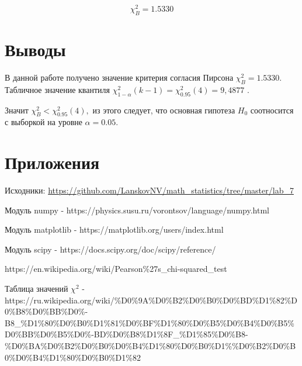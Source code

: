 \documentclass[12pt]{article}
\begin{document}
$$\chi_B^2= 1.5330$$

\section{Выводы}

В данной работе получено значение критерия согласия Пирсона $\chi_B^2 = 1.5330.$ Табличное значение квантиля  $\chi^2_{1-\alpha}(k-1)=\chi^2_{0.95}(4) = 9,4877$ \cite{chi_quant}.

Значит $\chi_B^2 < \chi^2_{0.95}(4),$ из этого следует, что основная гипотеза $H_0$ соотносится с выборкой на уровне $\alpha = 0.05.$

\section{Приложения}

Исходники: \url{https://github.com/LanskovNV/math_statistics/tree/master/lab_7}

\begin{thebibliography}{}
      Модуль numpy  -  https://physics.susu.ru/vorontsov/language/numpy.html
    
    Модуль matplotlib - https://matplotlib.org/users/index.html
    
    Модуль scipy - https://docs.scipy.org/doc/scipy/reference/
    

https://en.wikipedia.org/wiki/Pearson\%27s\_chi-squared\_test

Таблица значений $\chi^2$ -  https://ru.wikipedia.org/wiki/\%D0\%9A\%D0\%B2\%D0\%B0\%D0\%BD\%D1\%82\%D0\%B8\%D0\%BB\%D0\%\do-B8\_\%D1\%80\%D0\%B0\%D1\%81\%D0\%BF\%D1\%80\%D0\%B5\%D0\%B4\%D0\%B5\%D0\%BB\%D0\%B5\%D0\%\do-BD\%D0\%B8\%D1\%8F\_\%D1\%85\%D0\%B8-\%D0\%BA\%D0\%B2\%D0\%B0\%D0\%B4\%D1\%80\%D0\%B0\%D1\%\%D0\%B2\%D0\%B0\%D0\%B4\%D1\%80\%D0\%B0\%D1\%82

\end{thebibliography}
\end{document}
